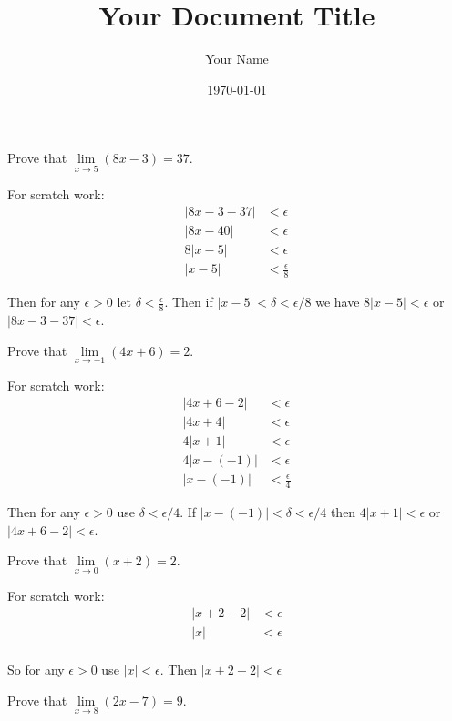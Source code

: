 \documentclass{article}
\title{Your Document Title}
\author{Your Name}
\date{\today} %
\begin{document}
\maketitle
\begin{problem}
Prove that $\lim\limits_{x\to 5} (8x - 3) = 37$.
\end{problem}

For scratch work:
\begin{align*}
  |8x - 3 - 37| & < \epsilon           \\
  |8x -40 |     & < \epsilon           \\
  8|x - 5|      & < \epsilon           \\
  |x - 5|       & < \frac{\epsilon}{8}
\end{align*}

Then for any $\epsilon > 0$ let $\delta < \frac{\epsilon}{8}$. Then if $|x - 5 | < \delta < \epsilon/8$ we have $8|x - 5| < \epsilon$ or $|8x - 3 - 37| < \epsilon$.

\begin{problem}
Prove that $\lim\limits_{x \to -1} (4x + 6) = 2$.
\end{problem}


For scratch work:
\begin{align*}
  |4x + 6 - 2| & < \epsilon           \\
  |4x + 4|     & < \epsilon           \\
  4|x + 1|     & < \epsilon           \\
  4|x - (-1)|  & < \epsilon           \\
  |x - (-1)|   & < \frac{\epsilon}{4}
\end{align*}

Then for any $\epsilon > 0$ use $\delta < \epsilon / 4$. If $|x - (-1)| < \delta < \epsilon / 4$ then $4|x + 1| < \epsilon$ or $|4x + 6 - 2| < \epsilon$.

\begin{problem}
Prove that $\lim\limits_{x\to 0}(x + 2) = 2$.
\end{problem}

For scratch work:
\begin{align*}
  |x + 2 - 2| & < \epsilon \\
  |x|         & < \epsilon \\
\end{align*}

So for any $\epsilon > 0$ use $|x| < \epsilon$. Then $|x + 2 - 2| < \epsilon$

\begin{problem}
Prove that $\lim\limits_{x \to 8} (2x - 7) = 9$.
\end{problem}
\end{document}
